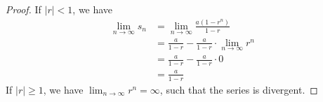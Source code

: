 \begin{proof}
  If \(|r| < 1\), we have
  \begin{equation}
    \nonumber
    \begin{aligned}
      \lim_{n \to \infty} s_{n} &= \lim_{n \to \infty} \frac{a(1 - r^{n})}{1 - r} \\
      &= \frac{a}{1 - r} - \frac{a}{1 - r} \cdot \lim_{n \to \infty} r^{n} \\
      &= \frac{a}{1 - r} - \frac{a}{1 - r} \cdot 0 \\
      &= \frac{a}{1 - r}
    \end{aligned}
  \end{equation}
  If \(|r| \geq 1\), we have \(\lim_{n \to \infty} r^{n} = \infty\), such that the series is divergent.
\end{proof}